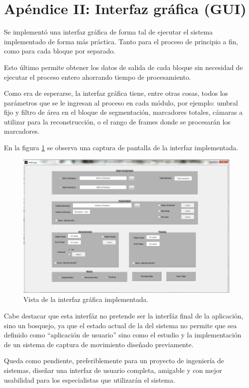 \section{Apéndice II: Interfaz gráfica (GUI)}

Se implementó una interfaz gráfica de forma tal de ejecutar el sistema implementado de forma más práctica. Tanto para el proceso de principio a fin, como para cada bloque por separado.

Esto último permite obtener los datos de salida de cada bloque sin necesidad de ejecutar el proceso entero ahorrando tiempo de procesamiento.

Como era de esperarse, la interfaz gráfica tiene, entre otras cosas, todos los parámetros que se le ingresan al proceso en cada módulo, por ejemplo: umbral fijo y filtro de área en el bloque de segmentación, marcadores totales, cámaras a utilizar para la reconstrucción, o el rango de frames donde se procesarán los marcadores.

En la figura \ref{guiVent} se observa una captura de pantalla de la interfaz implementada.

\begin{figure}[H]
\begin{center}
\includegraphics[scale=0.6]{img/gui.png}
\end{center}
\caption{Vista de la interfaz gráfica implementada.}
\label{guiVent}
\end{figure}

Cabe destacar que esta interfáz no pretende ser la interfáz final de la aplicación, sino un bosquejo, ya que el estado actual de la del sistema no permite que sea definido como ``aplicación de usuario'' sino como el estudio y la implementación de un sistema de captura de movimiento diseñado previamente.

Queda como pendiente, preferiblemente para un proyecto de ingeniería de sistemas, diseñar una interfaz de usuario completa, amigable y con mejor usabilidad para los especialistas que utilizarán el sistema.